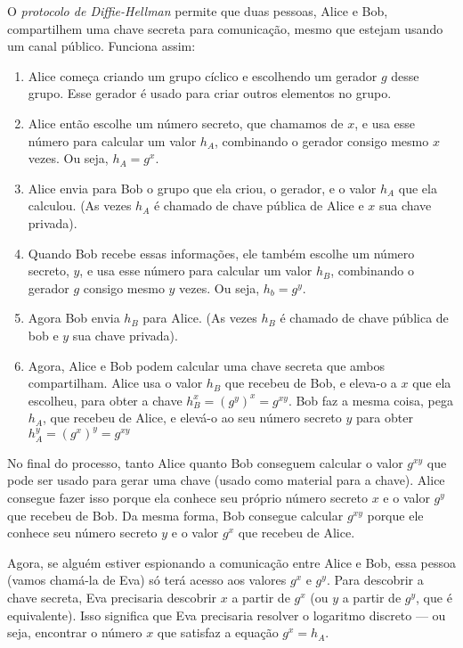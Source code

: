 O {\em protocolo de Diffie-Hellman} permite que duas pessoas, Alice e Bob, compartilhem uma chave secreta para comunicação, mesmo que estejam usando um canal público.
Funciona assim:
\begin{enumerate}
\item  Alice começa criando um grupo cíclico e escolhendo um gerador $g$ desse grupo.
  Esse gerador é usado para criar outros elementos no grupo.
\item Alice então escolhe um número secreto, que chamamos de $x$, e usa esse número para calcular um valor $h_A$, combinando o gerador consigo mesmo $x$ vezes.
  Ou seja, $h_A = g^x$.
\item Alice envia para Bob o grupo que ela criou, o gerador, e o valor $h_A$ que ela calculou.
(As vezes $h_A$ é chamado de chave pública de Alice e $x$ sua chave privada).
\item Quando Bob recebe essas informações, ele também escolhe um número secreto, $y$, e usa esse número para calcular um valor $h_B$, combinando o gerador $g$ consigo mesmo $y$ vezes.
  Ou seja, $h_b = g^y$.
\item Agora Bob envia $h_B$ para Alice.
  (As vezes $h_B$ é chamado de chave pública de bob e $y$ sua chave privada).
\item Agora, Alice e Bob podem calcular uma chave secreta que ambos compartilham.
  Alice usa o valor $h_B$ que recebeu de Bob, e eleva-o a $x$ que ela escolheu, para obter a chave $h_B^x = (g^y)^x = g^{xy}$.
  Bob faz a mesma coisa, pega $h_A$, que recebeu de Alice, e elevá-o ao seu número secreto $y$ para obter $h_A^y = (g^x)^y = g^{xy}$
\end{enumerate}

No final do processo, tanto Alice quanto Bob conseguem calcular o valor $g^{xy}$ que pode ser usado para gerar uma chave (usado como material para a chave).
Alice consegue fazer isso porque ela conhece seu próprio número secreto $x$ e o valor $g^y$ que recebeu de Bob.
Da mesma forma, Bob consegue calcular $g^{xy}$ porque ele conhece seu número secreto $y$ e o valor $g^x$ que recebeu de Alice.

Agora, se alguém estiver espionando a comunicação entre Alice e Bob, essa pessoa (vamos chamá-la de Eva) só terá acesso aos valores $g^x$ e $g^y$.
Para descobrir a chave secreta, Eva precisaria descobrir $x$ a partir de $g^x$ (ou $y$ a partir de $g^y$, que é equivalente).
Isso significa que Eva precisaria resolver o logaritmo discreto — ou seja, encontrar o número $x$ que satisfaz a equação $g^x = h_A$.

